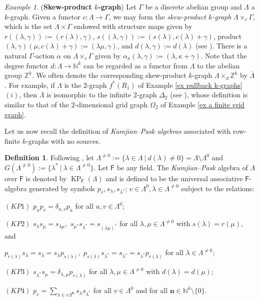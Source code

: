 \documentclass[12pt]{amsart}
\newcommand{\ZZ}{\mathbb{Z}}
\newcommand{\N}{\mathbf{n}}
\newcommand{\KP}{\operatorname{KP}}
\theoremstyle{definition}
\newtheorem{dfn}[thm]{Definition}
\theoremstyle{remark}
\newtheorem{example}[thm]{Example}
\begin{document}
\begin{example}\label{ex skew-product k-graphs}
(\textbf{Skew-product $k$-graph}) Let $\Gamma$ be a discrete abelian group and $\Lambda$ a $k$-graph. Given a functor $c : \Lambda \to \Gamma$, we may form the \emph{skew-product $k$-graph} $\Lambda \times_c \Gamma$, which is the set $\Lambda \times \Gamma$ endowed with structure maps given by $r((\lambda, \gamma)) := (r(\lambda), \gamma)$, $s((\lambda, \gamma)) :=(s(\lambda), c(\lambda) + \gamma)$, product $(\lambda, \gamma)(\mu, c(\lambda)+ \gamma ) := (\lambda\mu, \gamma)$, and $d ( \lambda, \gamma):= d(\lambda)$ (see \cite[Definition 5.1]{Kumjian--Pask}). There is a natural $\Gamma$-action $\alpha$ on $\Lambda \times_c \Gamma$ given by $\alpha_\kappa( \lambda , \gamma) := ( \lambda
, \kappa + \gamma )$. Note that the degree functor $d:\Lambda\longrightarrow \mathbb{N}^k$ can be regarded as a functor from $\Lambda$ to the abelian group $\ZZ^k$. We often denote the corresponding skew-product $k$-graph $\Lambda\times_d \ZZ^k$ by $\overline{\Lambda}$. For example, if $\Lambda$ is the $2$-graph $f^*(R_1)$ of Example \ref{ex pullback k-graphs} $(i)$, then $\overline{\Lambda}$ is isomorphic to the infinite $2$-graph $\Delta_2$ (see \cite[Example 2.2 $(iv)$]{HMPS}), whose definition is similar to that of the $2$-dimensional grid graph $\Omega_2$ of Example \ref{ex a finite grid graph}. 
\end{example}

Let us now recall the definition of \emph{Kumjian--Pask algebras} associated with row-finite $k$-graphs with no sources. 
\begin{dfn}\label{def KP-algebra}
Following \cite{Pino}, let $\Lambda^{\neq 0}:=\{\lambda\in \Lambda~|~d(\lambda)\neq 0\}=\Lambda\setminus \Lambda^0$ and $G(\Lambda^{\neq 0}):=\{\lambda^*~|~\lambda\in \Lambda^{\neq 0}\}$. Let $\mathsf{F}$ be any field. The \emph{Kumjian--Pask} algebra of $\Lambda$ over $\mathsf{F}$ is denoted by $\KP_\mathsf{F}(\Lambda)$ and is defined to be the universal associative $\mathsf{F}$-algebra generated by symbols $p_v,s_\lambda,s_{\lambda^*}$; $v\in \Lambda^0,\lambda\in \Lambda^{\neq 0}$ subject to the relations:

$(KP1)$ $p_up_v=\delta_{u,v}p_u$ for all $u,v\in \Lambda^0$;

$(KP2)$ $s_\lambda s_\mu=s_{\lambda\mu},$ $s_{\mu^*}s_{\lambda^*}=s_{(\lambda\mu)^*}$ for all $\lambda,\mu\in \Lambda^{\neq 0}$ with $s(\lambda)=r(\mu)$, and

$p_{r(\lambda)}s_\lambda=s_\lambda=s_\lambda p_{s(\lambda)},$ $p_{s(\lambda)}s_{\lambda^*}=s_{\lambda^*}=s_{\lambda^*}p_{r(\lambda)}$ for all $\lambda\in \Lambda^{\neq 0}$;

$(KP3)$ $s_{\lambda^*} s_\mu=\delta_{\lambda,\mu}p_{s(\lambda)}$ for all $\lambda,\mu\in \Lambda^{\neq 0}$ with $d(\lambda)=d(\mu)$;

$(KP4)$ $p_v=\displaystyle{\sum_{\lambda\in v\Lambda^\N}} s_\lambda s_{\lambda^*}$ for all $v\in \Lambda^0$ and for all $\N\in \mathbb{N}^k\setminus \{0\}$.
\end{dfn}
\end{document}
